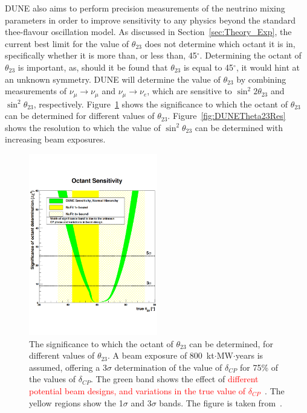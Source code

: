 DUNE also aims to perform precision measurements of the neutrino mixing parameters in order to improve sensitivity to any physics beyond the standard thee-flavour oscillation model. As discussed in Section~\ref{sec:Theory_Exp}, the current best limit for the value of $\theta_{23}$ does not determine which octant it is in, specifically whether it is more than, or less than, 45$^{\circ}$. Determining the octant of $\theta_{23}$ is important, as, should it be found that $\theta_{23}$ is equal to 45$^{\circ}$, it would hint at an unknown symmetry. DUNE will determine the value of $\theta_{23}$ by combining measurements of $\nu_{\mu} \rightarrow \nu_{\mu}$ and $\nu_{\mu} \rightarrow \nu_{e}$, which are sensitive to $\sin^{2}2\theta_{23}$ and $\sin^2\theta_{23}$, respectively. Figure~\ref{fig:DUNEOctantDetermination} shows the significance to which the octant of $\theta_{23}$ can be determined for different values of $\theta_{23}$. Figure~\ref{fig:DUNETheta23Res} shows the resolution to which the value of $\sin^{2}\theta_{23}$ can be determined with increasing beam exposures. \\

\begin{figure}
  \centering
  \includegraphics[width=0.5\textwidth]{DUNEOctantDetermination}
  \caption[The significance to which the octant of $\theta_{23}$ can be determined, for different values of $\theta_{23}$]
          {The significance to which the octant of $\theta_{23}$ can be determined, for different values of $\theta_{23}$. A beam exposure of 800~kt$\cdot$MW$\cdot$years is assumed, offering a 3$\sigma$ determination of the value of $\delta_{CP}$ for 75\% of the values of $\delta_{CP}$. The green band shows the effect of \textcolor{red}{different potential beam designs, and variations in the true value of $\delta_{CP}$}~\citep{DUNECDR_V3}. The yellow regions show the 1$\sigma$ and 3$\sigma$ bands. The figure is taken from~\citep{DUNECDR_V2}.}
  \label{fig:DUNEOctantDetermination}
\end{figure}

